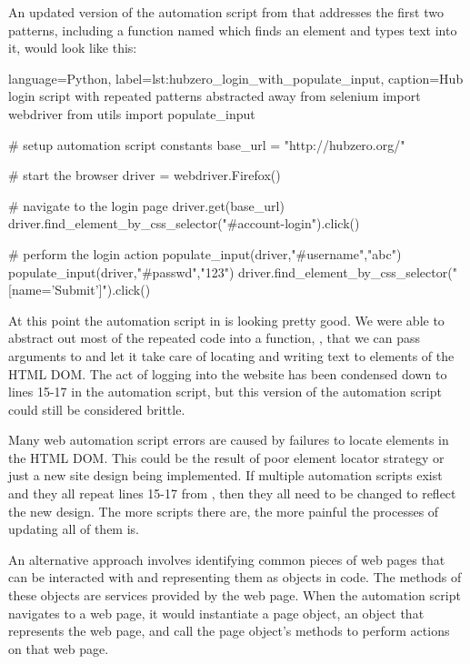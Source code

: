 \noindent

An updated version of the automation script from
 that addresses the first two patterns,
including a function named  which finds an element
and types text into it, would look like this:

\begin{xcode}{%
  language=Python,%
  label=lst:hubzero_login_with_populate_input,%
  caption={Hub login script with repeated patterns abstracted away}%
}
from selenium import webdriver
from utils import populate_input

# setup automation script constants
base_url = "http://hubzero.org/"

# start the browser
driver = webdriver.Firefox()

# navigate to the login page
driver.get(base_url)
driver.find_element_by_css_selector("#account-login").click()

# perform the login action
populate_input(driver,"#username","abc")
populate_input(driver,"#passwd","123")
driver.find_element_by_css_selector("[name='Submit']").click()
\end{xcode}

At this point the automation script in
 is looking pretty good. We were
able to abstract out most of the repeated code into a function,
, that we can pass arguments to and let it take
care of locating and writing text to elements of the HTML DOM. The act of
logging into the website has been condensed down to lines 15-17 in the
automation script, but this version of the automation script could still be
considered brittle.

Many web automation script errors are caused by failures to locate
elements in the HTML DOM.  This could be the result of poor element locator
strategy or just a new site design being implemented.  If multiple automation
scripts exist and they all repeat lines 15-17 from
, then they all need to be changed
to reflect the new design. The more scripts there are, the more painful the
processes of updating all of them is.

An alternative approach involves identifying common pieces of web pages that
can be interacted with and representing them as objects in code. The methods of
these objects are services provided by the web page. When the automation script
navigates to a web page, it would instantiate a page object, an object that
represents the web page, and call the page object's methods to perform actions
on that web page.

